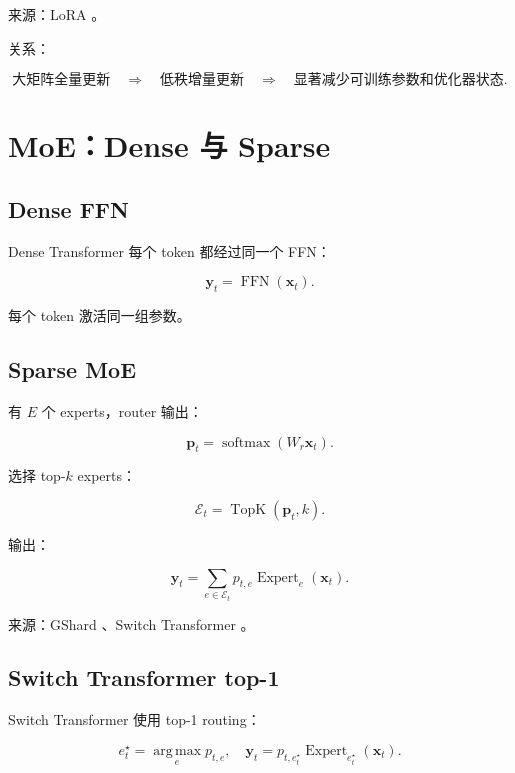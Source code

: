 \documentclass[UTF8,12pt]{ctexart}
\newcommand{\1}{\mathbf{1}}
\newcommand{\softmax}{\operatorname{softmax}}
\newcommand{\argmax}{\operatorname*{arg\,max}}
\newcommand{\TopK}{\operatorname{TopK}}
\newcommand{\FFN}{\operatorname{FFN}}
\begin{document}
来源：LoRA \cite{hu2021lora}。

关系：

\[
\text{大矩阵全量更新}
\quad\Longrightarrow\quad
\text{低秩增量更新}
\quad\Longrightarrow\quad
\text{显著减少可训练参数和优化器状态}.
\]

\section{MoE：Dense 与 Sparse}

\subsection{Dense FFN}

Dense Transformer 每个 token 都经过同一个 FFN：

\begin{equation}
\bm{y}_t=\FFN(\bm{x}_t).
\end{equation}

每个 token 激活同一组参数。

\subsection{Sparse MoE}

有 $E$ 个 experts，router 输出：

\begin{equation}
\bm{p}_t=\softmax(W_r\bm{x}_t).
\end{equation}

选择 top-$k$ experts：

\begin{equation}
\mathcal{E}_t=\TopK(\bm{p}_t,k).
\end{equation}

输出：

\begin{equation}
\bm{y}_t
=\sum_{e\in\mathcal{E}_t}
p_{t,e}\operatorname{Expert}_e(\bm{x}_t).
\label{eq:moe}
\end{equation}

来源：GShard \cite{lepikhin2020gshard}、Switch Transformer \cite{fedus2021switch}。

\subsection{Switch Transformer top-1}

Switch Transformer 使用 top-1 routing：

\begin{equation}
e^\star_t=\argmax_e p_{t,e},
\quad
\bm{y}_t=p_{t,e^\star_t}\operatorname{Expert}_{e^\star_t}(\bm{x}_t).
\end{equation}
\end{document}
